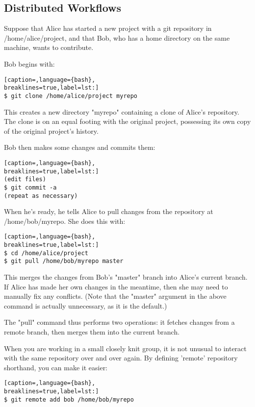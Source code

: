 \subsection{Distributed Workflows}
Suppose that Alice has started a new project with a git repository in
/home/alice/project, and that Bob, who has a home directory on the same
machine, wants to contribute.

Bob begins with:
\lstset{basicstyle=\scriptsize, numbers=none, captionpos=b, tabsize=4}
\begin{lstlisting}[caption=,language={bash},
breaklines=true,label=lst:]
$ git clone /home/alice/project myrepo
\end{lstlisting}

This creates a new directory "myrepo" containing a clone of Alice's repository.
The clone is on an equal footing with the original project, possessing its own
copy of the original project's history.

Bob then makes some changes and commits them:
\lstset{basicstyle=\scriptsize, numbers=none, captionpos=b, tabsize=4}
\begin{lstlisting}[caption=,language={bash},
breaklines=true,label=lst:]
(edit files)
$ git commit -a
(repeat as necessary)
\end{lstlisting}

When he's ready, he tells Alice to pull changes from the repository at
/home/bob/myrepo. She does this with:
\lstset{basicstyle=\scriptsize, numbers=none, captionpos=b, tabsize=4}
\begin{lstlisting}[caption=,language={bash},
breaklines=true,label=lst:]
$ cd /home/alice/project
$ git pull /home/bob/myrepo master
\end{lstlisting}

This merges the changes from Bob's "master" branch into Alice's current branch.
If Alice has made her own changes in the meantime, then she may need to
manually fix any conflicts. (Note that the "master" argument in the above
command is actually unnecessary, as it is the default.)

The "pull" command thus performs two operations: it fetches changes from a
remote branch, then merges them into the current branch.

When you are working in a small closely knit group, it is not unusual to
interact with the same repository over and over again. By defining 'remote'
repository shorthand, you can make it easier:
\lstset{basicstyle=\scriptsize, numbers=none, captionpos=b, tabsize=4}
\begin{lstlisting}[caption=,language={bash},
breaklines=true,label=lst:]
$ git remote add bob /home/bob/myrepo
\end{lstlisting}

